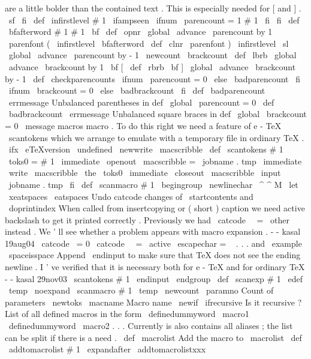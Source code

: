 {{are
a
little
bolder
than
%
the
contained
text
.
This
is
especially
needed
for
[
and
]
.
\
sf
\
fi
}
\
def
\
infirstlevel
#
1
{
%
\
ifampseen
\
ifnum
\
parencount
=
1
#
1
%
\
fi
\
fi
}
\
def
\
bfafterword
#
1
{
#
1
\
bf
}
\
def
\
opnr
{
%
\
global
\
advance
\
parencount
by
1
{
\
parenfont
(
}
%
\
infirstlevel
\
bfafterword
}
\
def
\
clnr
{
%
{
\
parenfont
)
}
%
\
infirstlevel
\
sl
\
global
\
advance
\
parencount
by
-
1
}
\
newcount
\
brackcount
\
def
\
lbrb
{
%
\
global
\
advance
\
brackcount
by
1
{
\
bf
[
}
%
}
\
def
\
rbrb
{
%
{
\
bf
]
}
%
\
global
\
advance
\
brackcount
by
-
1
}
\
def
\
checkparencounts
{
%
\
ifnum
\
parencount
=
0
\
else
\
badparencount
\
fi
\
ifnum
\
brackcount
=
0
\
else
\
badbrackcount
\
fi
}
\
def
\
badparencount
{
%
\
errmessage
{
Unbalanced
parentheses
in
def
}
%
\
global
\
parencount
=
0
}
\
def
\
badbrackcount
{
%
\
errmessage
{
Unbalanced
square
braces
in
def
}
%
\
global
\
brackcount
=
0
}
\
message
{
macros
}
%
macro
.
%
To
do
this
right
we
need
a
feature
of
e
-
TeX
\
scantokens
%
which
we
arrange
to
emulate
with
a
temporary
file
in
ordinary
TeX
.
\
ifx
\
eTeXversion
\
undefined
\
newwrite
\
macscribble
\
def
\
scantokens
#
1
{
%
\
toks0
=
{
#
1
}
%
\
immediate
\
openout
\
macscribble
=
\
jobname
.
tmp
\
immediate
\
write
\
macscribble
{
\
the
\
toks0
}
%
\
immediate
\
closeout
\
macscribble
\
input
\
jobname
.
tmp
}
\
fi
\
def
\
scanmacro
#
1
{
%
\
begingroup
\
newlinechar
\
^
^
M
\
let
\
xeatspaces
\
eatspaces
%
Undo
catcode
changes
of
\
startcontents
and
\
doprintindex
%
When
called
from
insertcopying
or
(
short
)
caption
we
need
active
%
backslash
to
get
it
printed
correctly
.
Previously
we
had
%
\
catcode
\
\
=
\
other
instead
.
We
'
ll
see
whether
a
problem
appears
%
with
macro
expansion
.
-
-
kasal
19aug04
\
catcode
\
=
0
\
catcode
\
\
=
\
active
\
escapechar
=
\
%
.
.
.
and
\
example
\
spaceisspace
%
%
Append
\
endinput
to
make
sure
that
TeX
does
not
see
the
ending
newline
.
%
%
I
'
ve
verified
that
it
is
necessary
both
for
e
-
TeX
and
for
ordinary
TeX
%
-
-
kasal
29nov03
\
scantokens
{
#
1
\
endinput
}
%
\
endgroup
}
\
def
\
scanexp
#
1
{
%
\
edef
\
temp
{
\
noexpand
\
scanmacro
{
#
1
}
}
%
\
temp
}
\
newcount
\
paramno
%
Count
of
parameters
\
newtoks
\
macname
%
Macro
name
\
newif
\
ifrecursive
%
Is
it
recursive
?
%
List
of
all
defined
macros
in
the
form
%
\
definedummyword
\
macro1
\
definedummyword
\
macro2
.
.
.
%
Currently
is
also
contains
all
aliases
;
the
list
can
be
split
%
if
there
is
a
need
.
\
def
\
macrolist
{
}
%
Add
the
macro
to
\
macrolist
\
def
\
addtomacrolist
#
1
{
\
expandafter
\
addtomacrolistxxx
}}
